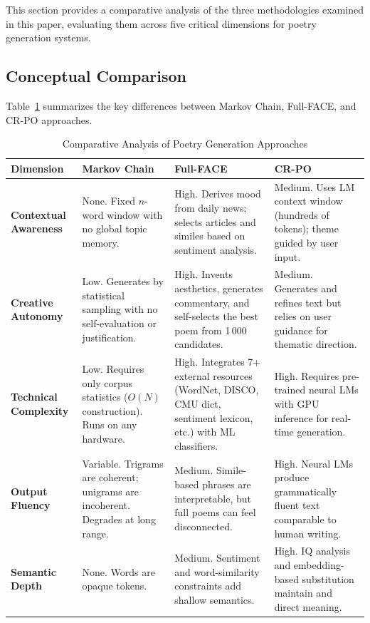\documentclass[conference]{IEEEtran}
\begin{document}
This section provides a comparative analysis of the three methodologies examined in this paper, evaluating them across five critical dimensions for poetry generation systems.

\subsection{Conceptual Comparison}

Table~\ref{tab:comparison} summarizes the key differences between Markov Chain, Full-FACE, and CR-PO approaches.

\begin{table}[htbp]
\centering
\caption{Comparative Analysis of Poetry Generation Approaches}
\label{tab:comparison}
\begin{tabularx}{\textwidth}{l X X X}
\toprule
\textbf{Dimension} & \textbf{Markov Chain} & \textbf{Full-FACE} & \textbf{CR-PO} \\
\midrule
\textbf{Contextual Awareness} & 
None. Fixed $n$-word window with no global topic memory. &
High. Derives mood from daily news; selects articles and similes based on sentiment analysis. &
Medium. Uses LM context window (hundreds of tokens); theme guided by user input. \\
\midrule
\textbf{Creative Autonomy} &
Low. Generates by statistical sampling with no self-evaluation or justification. &
High. Invents aesthetics, generates commentary, and self-selects the best poem from 1\,000 candidates. &
Medium. Generates and refines text but relies on user guidance for thematic direction. \\
\midrule
\textbf{Technical Complexity} &
Low. Requires only corpus statistics ($O(N)$ construction). Runs on any hardware. &
High. Integrates 7+ external resources (WordNet, DISCO, CMU dict, sentiment lexicon, etc.) with ML classifiers. &
High. Requires pre-trained neural LMs with GPU inference for real-time generation. \\
\midrule
\textbf{Output Fluency} &
Variable. Trigrams are coherent; unigrams are incoherent. Degrades at long range. &
Medium. Simile-based phrases are interpretable, but full poems can feel disconnected. &
High. Neural LMs produce grammatically fluent text comparable to human writing. \\
\midrule
\textbf{Semantic Depth} &
None. Words are opaque tokens. &
Medium. Sentiment and word-similarity constraints add shallow semantics. &
High. IQ analysis and embedding-based substitution maintain and direct meaning. \\
\bottomrule
\end{tabularx}
\end{table}
\end{document}
